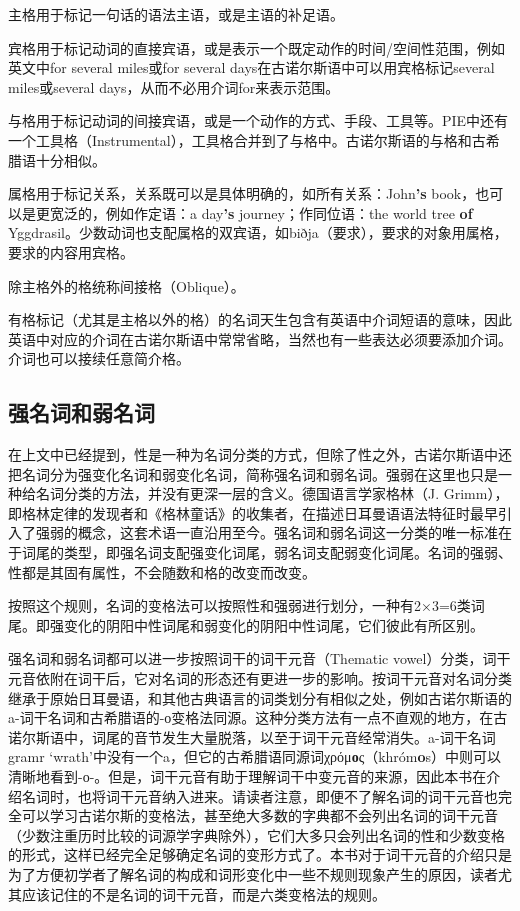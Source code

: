 主格用于标记一句话的语法主语，或是主语的补足语。

宾格用于标记动词的直接宾语，或是表示一个既定动作的时间/空间性范围，例如英文中for
several miles‌或for several days在古诺尔斯语中可以用宾格标记several
miles或several days，从而不必用介词for来表示范围。

与格用于标记动词的间接宾语，或是一个动作的方式、手段、工具等。PIE中还有一个工具格（Instrumental），工具格合并到了与格中。古诺尔斯语的与格和古希腊语十分相似。

属格用于标记关系，关系既可以是具体明确的，如所有关系：John\textbf{'s}
book，也可以是更宽泛的，例如作定语：a day\textbf{‌'s}
journey；作同位语：the world tree \textbf{of}
Yggdrasil。少数动词也支配属格的双宾语，如biðja（要求），要求的对象用属格，要求的内容用宾格。

除主格外的格统称间接格（Oblique）。

有格标记（尤其是主格以外的格）的名词天生包含有英语中介词短语的意味，因此英语中对应的介词在古诺尔斯语中常常省略，当然也有一些表达必须要添加介词。介词也可以接续任意简介格。

\subsection{强名词和弱名词}
在上文中已经提到，性是一种为名词分类的方式，但除了性之外，古诺尔斯语中还把名词分为强变化名词和弱变化名词，简称强名词和弱名词。强弱在这里也只是一种给名词分类的方法，并没有更深一层的含义。德国语言学家格林（J. Grimm），即格林定律的发现者和《格林童话》的收集者，在描述日耳曼语语法特征时最早引入了强弱的概念，这套术语一直沿用至今。强名词和弱名词这一分类的唯一标准在于词尾的类型，即强名词支配强变化词尾，弱名词支配弱变化词尾。名词的强弱、性都是其固有属性，不会随数和格的改变而改变。

按照这个规则，名词的变格法可以按照性和强弱进行划分，一种有2×3=6类词尾。即强变化的阴阳中性词尾和弱变化的阴阳中性词尾，它们彼此有所区别。

强名词和弱名词都可以进一步按照词干的词干元音（Thematic
vowel）分类，词干元音依附在词干后，它对名词的形态还有更进一步的影响。按词干元音对名词分类继承于原始日耳曼语，和其他古典语言的词类划分有相似之处，例如古诺尔斯语的a-词干名词和古希腊语的-ο变格法同源。这种分类方法有一点不直观的地方，在古诺尔斯语中，词尾的音节发生大量脱落，以至于词干元音经常消失。a-词干名词gramr
`wrath'中没有一个a，但它的古希腊语同源词χρόμ\textbf{ο}ς（khróm\textbf{o}s）中则可以清晰地看到-ο-。但是，词干元音有助于理解词干中变元音的来源，因此本书在介绍名词时，也将词干元音纳入进来。请读者注意，即便不了解名词的词干元音也完全可以学习古诺尔斯的变格法，甚至绝大多数的字典都不会列出名词的词干元音（少数注重历时比较的词源学字典除外），它们大多只会列出名词的性和少数变格的形式，这样已经完全足够确定名词的变形方式了。本书对于词干元音的介绍只是为了方便初学者了解名词的构成和词形变化中一些不规则现象产生的原因，读者尤其应该记住的不是名词的词干元音，而是六类变格法的规则。

